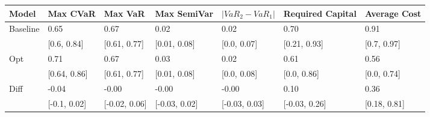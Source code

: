 \begin{tabular}{lllllll}
\toprule
   Model &     Max CVaR &       Max VaR &   Max SemiVar & $|VaR_2 - VaR_1|$ & Required Capital & Average Cost \\
\midrule
Baseline &         0.65 &          0.67 &          0.02 &              0.02 &             0.70 &         0.91 \\
         &  [0.6, 0.84] &  [0.61, 0.77] &  [0.01, 0.08] &       [0.0, 0.07] &     [0.21, 0.93] &  [0.7, 0.97] \\
     Opt &         0.71 &          0.67 &          0.03 &              0.02 &             0.61 &         0.56 \\
         & [0.64, 0.86] &  [0.61, 0.77] &  [0.01, 0.08] &       [0.0, 0.08] &      [0.0, 0.86] &  [0.0, 0.74] \\
    Diff &        -0.04 &         -0.00 &         -0.00 &             -0.00 &             0.10 &         0.36 \\
         & [-0.1, 0.02] & [-0.02, 0.06] & [-0.03, 0.02] &     [-0.03, 0.03] &    [-0.03, 0.26] & [0.18, 0.81] \\
\bottomrule
\end{tabular}
